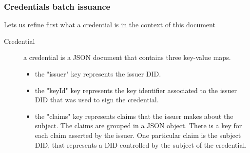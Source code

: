 \documentclass[10pt,a4paper]{article}
\begin{document}
\subsubsection{Credentials batch issuance}

Lets us refine first what a credential is in the context of this document

\begin{description}
\item[Credential] a credential is a JSON document that contains three key-value maps.
 \begin{itemize}
 \item the "issuer" key represents the issuer DID.
 \item the "keyId" key represents the key identifier associated to the issuer DID that was used to sign the credential.
 \item the "claims" key represents claims that the issuer makes about the subject. The claims are grouped in a JSON object.
       There is a key for each claim asserted by the issuer. One particular claim is the subject DID, that represents a DID
       controlled by the subject of the credential.
 \end{itemize}
\end{description}
\end{document}
